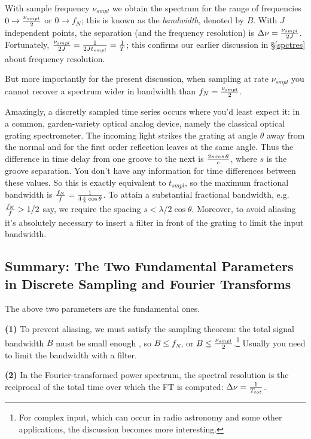 \documentclass[11pt,preprint]{aastex}
\begin{document}
	With sample frequency $\nu_{smpl}$ we obtain the spectrum for
the range of frequencies $0 \rightarrow {\nu_{smpl} \over 2}$ or $0
\rightarrow f_N$; this is known as the {\it bandwidth}, denoted by $B$.
With $J$ independent points, the separation (and the frequency
resolution) is $\Delta \nu = {\nu_{smpl} \over 2J}$. Fortunately,
${\nu_{smpl} \over 2J} = {1 \over 2 J t_{smpl}} = {1 \over T}$; this
confirms our earlier discussion in \S \ref{spctres} about frequency
resolution. 

	But more importantly for the present discussion, when sampling
at rate $\nu_{smpl}$ you cannot recover a spectrum wider in bandwidth
than $f_N = {\nu_{smpl} \over 2}$. 

	Amazingly, a discretly sampled time series occurs where you'd
least expect it: in a common, garden-variety optical analog device,
namely the classical optical grating spectrometer. The incoming light
strikes the grating at angle $\theta$ away from the normal and for the
first order reflection leaves at the same angle. Thus the difference in
time delay from one groove to the next is ${2s \cos \theta \over c}$,
where $s$ is the groove separation. You don't have any information for
time differences between these values. So this is exactly equivalent to
$t_{smpl}$, so the maximum fractional bandwidth is ${f_N \over f} = {1
\over 4 {s \over \lambda} \cos \theta}$. To attain a substantial
fractional bandwidth, e.g.\ ${f_N \over f} > {1/2}$ say, we require the
spacing $s < {\lambda /2 \cos \theta}$. Moreover, to avoid aliasing it's
absolutely necessary to insert a filter in front of the grating to limit
the input bandwidth. 

\subsection {Summary: The Two Fundamental Parameters in Discrete
Sampling and Fourier Transforms}

	The above two parameters are the fundamental ones.  

	{\bf (1)} To prevent aliasing, we must satisfy the sampling
theorem: the total signal bandwidth $B$ must be small enough , so $B
\leq f_N$, or $B \leq {\nu_{smpl} \over 2}$.\footnote{For complex input,
which can occur in radio astronomy and some other applications, the
discussion becomes more interesting.} Usually you need to limit the
bandwidth with a filter.

	{\bf (2)} In the Fourier-transformed power spectrum, the spectral
resolution is the reciprocal of the total time over which the FT is
computed: $\Delta \nu ={1 \over T_{tot}}$. 
\end{document}
